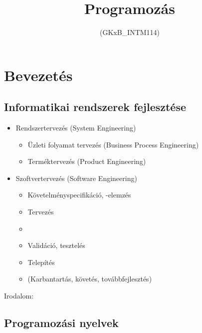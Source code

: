 \documentclass[usenames,dvipsnames,aspectratio=169]{beamer}
\title[1. előadás]{Programozás}
\subtitle{(GKxB\_INTM114)}
\begin{document}
\begin{frame}[plain]
  \titlepage
  \logoalul
\end{frame}

\section{Bevezetés}
\subsection{Informatikai rendszerek fejlesztése}

\begin{frame}
  \begin{itemize}
    \item Rendszertervezés (System Engineering)
    \begin{itemize}
      \item Üzleti folyamat tervezés (Business Process Engineering)
      \item Terméktervezés (Product Engineering)
    \end{itemize}
    \item Szoftvertervezés (Software Engineering)
    \begin{itemize}
      \item Követelményspecifikáció, -elemzés
      \item Tervezés
      \item {}
      \item Validáció, tesztelés
      \item Telepítés
      \item (Karbantartás, követés, továbbfejlesztés)
    \end{itemize}
  \end{itemize}
  \vfill
  \tiny{Irodalom:  }
\end{frame}

\subsection{Programozási nyelvek}
\end{document}
